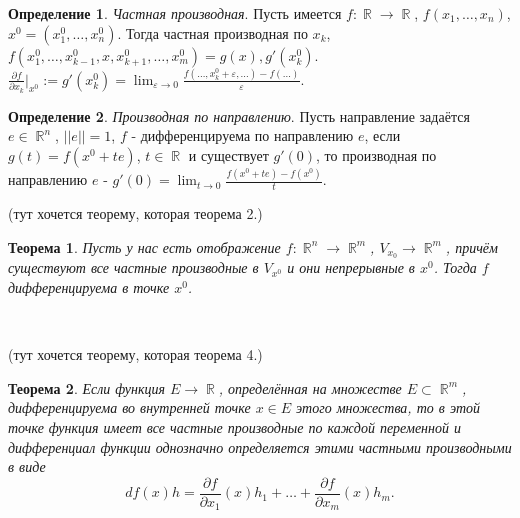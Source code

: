 \documentclass[a4paper,100pt]{article}
\theoremstyle{indented}
\newtheorem{theorem}{Теорема}
\theoremstyle{definition}
\newtheorem{defn}{Определение}
\theoremstyle{remark}
\DeclareMathOperator{\RR}{\mathbb{R}}
\begin{document}
\begin{defn}
    \textit{Частная производная}. Пусть имеется $f:\RR\rightarrow \RR$, $f(x_1, \ldots, x_n)$, $x^0=(x_1^0, \ldots, x_n^0)$. Тогда частная производная по $x_k $, $f(x_1^0, \ldots, x_{k-1}^0, x, x_{k+1}^0, \ldots, x_m^0)=g(x), g'(x_k^0)$. $\frac{\partial f}{\partial x_k}\bigg|_{x^0}:=g'(x_k^0)=\lim_{\varepsilon\rightarrow 0}\frac{f(\ldots, x_k^0+\varepsilon, \ldots)-f(\ldots)}{\varepsilon}$. 
\end{defn}

\begin{defn}
    \textit{Производная по направлению}. Пусть направление задаётся $e\in\RR^n$, $||e||=1$, $f$ - дифференцируема по направлению $e$, если $g(t)=f(x^0+te)$, $t\in\RR$ и существует $g'(0)$, то производная по направлению $e$ - $g'(0)=\lim_{t\rightarrow 0}\frac{f(x^0+te)-f(x^0)}{t}$. 
\end{defn}

(тут хочется теорему, которая теорема 2.) \\

\begin{theorem}
    Пусть у нас есть отображение $f:\RR^n\rightarrow \RR^m$, $V_{x_0}\rightarrow \RR^m$, причём существуют все частные производные в $V_{x^0}$ и они непрерывные в $x^0$. Тогда $f$ дифференцируема в точке $x^0$. 
\end{theorem} \ 

(тут хочется теорему, которая теорема 4.) \\

\begin{theorem}
    Если функция $E\rightarrow \RR$, определённая на множестве $E\subset \RR^m$, дифференцируема во внутренней точке $x\in E$ этого множества, то в этой точке функция имеет все частные производные по каждой переменной и дифференциал функции однозначно определяется этими частными производными в виде
    \[
      df(x)h=\frac{\partial f}{\partial x_1}(x)h_1+\ldots+\frac{\partial f}{\partial x_m}(x)h_m. 
    \]
  \end{theorem}
\end{document}
